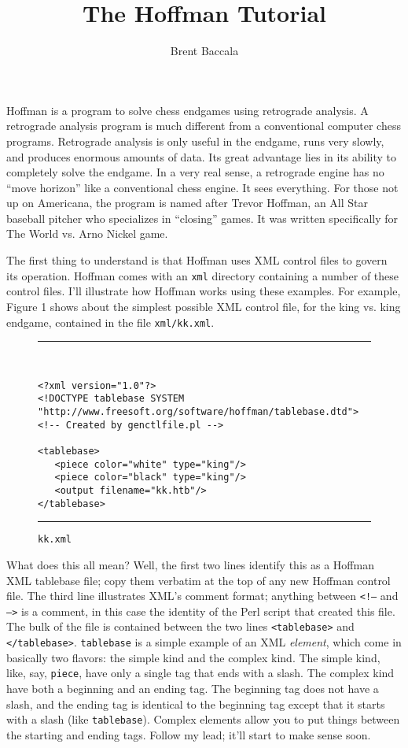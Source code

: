 \documentclass[11pt]{article}
\title{The Hoffman Tutorial}
\author{Brent Baccala}
\begin{document}
\maketitle

\parindent 0pt
\parskip 12pt

Hoffman is a program to solve chess endgames using retrograde
analysis.
A retrograde analysis program is much different from a conventional
computer chess programs.  Retrograde analysis is only useful in the
endgame, runs very slowly, and produces enormous amounts of data.  Its
great advantage lies in its ability to completely solve the endgame.
In a very real sense, a retrograde engine has no ``move horizon'' like a
conventional chess engine.  It sees everything.
For those not up on Americana, the program is named after
Trevor Hoffman, an All Star baseball pitcher who specializes in
``closing'' games.  It was written specifically for The World vs. Arno
Nickel game.

The first thing to understand is that Hoffman uses XML
control files to govern its operation.
Hoffman comes with an {\tt xml} directory containing a number of
these control files.  I'll illustrate how Hoffman works using these
examples.
For example, Figure 1 shows about the simplest possible XML control file, for
the king vs. king endgame, contained in the file {\tt xml/kk.xml}.


\begin{figure}
\hrule\ 
{\small\begin{verbatim}
<?xml version="1.0"?>
<!DOCTYPE tablebase SYSTEM "http://www.freesoft.org/software/hoffman/tablebase.dtd">
<!-- Created by genctlfile.pl -->

<tablebase>
   <piece color="white" type="king"/>
   <piece color="black" type="king"/>
   <output filename="kk.htb"/>
</tablebase>
\end{verbatim}}
\hrule
\caption{\tt kk.xml}
\end{figure}

What does this all mean?  Well, the first two lines identify this as a
Hoffman XML tablebase file; copy them verbatim at the top of any new
Hoffman control file.  The third line illustrates XML's comment
format; anything between {\tt <!--} and {\tt -->} is a comment, in
this case the identity of the Perl script that created this file. The
bulk of the file is contained between the two lines {\tt <tablebase>}
and {\tt </tablebase>}.  {\tt tablebase} is a simple example of an XML
{\it element}, which come in basically two flavors: the simple kind
and the complex kind.  The simple kind, like, say, {\tt piece}, have
only a single tag that ends with a slash.  The complex kind have both
a beginning and an ending tag.  The beginning tag does not have a
slash, and the ending tag is identical to the beginning tag except
that it starts with a slash (like {\tt tablebase}).  Complex elements
allow you to put things between the starting and ending tags.  Follow
my lead; it'll start to make sense soon.
\end{document}
